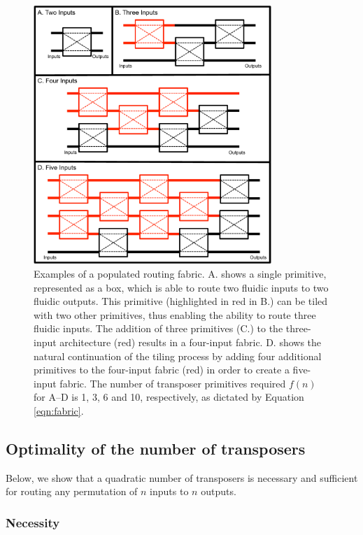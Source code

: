     \begin{figure}[h]
     \begin{minipage}[t]{0.99\linewidth}\centering
      \includegraphics[width=9cm]{fig4.pdf}
      \medskip
     \end{minipage}\hfill
     \caption[Examples of a populated routing fabric]{Examples of a populated routing fabric. A. shows a single primitive, represented as a box, which is able to route two fluidic inputs to two fluidic outputs. This primitive (highlighted in red in B.) can be tiled with two other primitives, thus enabling the ability to route three fluidic inputs. The addition of three primitives (C.) to the three-input architecture (red) results in a four-input fabric. D. shows the natural continuation of the tiling process by adding four additional primitives to the four-input fabric (red) in order to create a five-input fabric. The number of transposer primitives required $f(n)$ for A--D is 1, 3, 6 and 10, respectively, as dictated by Equation \ref{eqn:fabric}.}
	    \label{fig:fabric}
    \end{figure}



\subsection{Optimality of the number of transposers}

Below, we show that a quadratic number of transposers is necessary and sufficient for routing any permutation of $n$ inputs to $n$ outputs.

\subsubsection{Necessity}

